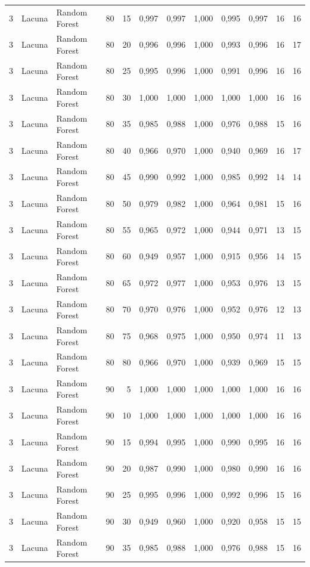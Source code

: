 \begin{longtable}{@{}rllrrrrrrrrr@{}}
3 & Lacuna & Random Forest & 80 & 15 & 0,997 & 0,997 & 1,000 & 0,995 & 0,997 & 16 & 16 \\
3 & Lacuna & Random Forest & 80 & 20 & 0,996 & 0,996 & 1,000 & 0,993 & 0,996 & 16 & 17 \\
3 & Lacuna & Random Forest & 80 & 25 & 0,995 & 0,996 & 1,000 & 0,991 & 0,996 & 16 & 16 \\
3 & Lacuna & Random Forest & 80 & 30 & 1,000 & 1,000 & 1,000 & 1,000 & 1,000 & 16 & 16 \\
3 & Lacuna & Random Forest & 80 & 35 & 0,985 & 0,988 & 1,000 & 0,976 & 0,988 & 15 & 16 \\
3 & Lacuna & Random Forest & 80 & 40 & 0,966 & 0,970 & 1,000 & 0,940 & 0,969 & 16 & 17 \\
3 & Lacuna & Random Forest & 80 & 45 & 0,990 & 0,992 & 1,000 & 0,985 & 0,992 & 14 & 14 \\
3 & Lacuna & Random Forest & 80 & 50 & 0,979 & 0,982 & 1,000 & 0,964 & 0,981 & 15 & 16 \\
3 & Lacuna & Random Forest & 80 & 55 & 0,965 & 0,972 & 1,000 & 0,944 & 0,971 & 13 & 15 \\
3 & Lacuna & Random Forest & 80 & 60 & 0,949 & 0,957 & 1,000 & 0,915 & 0,956 & 14 & 15 \\
3 & Lacuna & Random Forest & 80 & 65 & 0,972 & 0,977 & 1,000 & 0,953 & 0,976 & 13 & 15 \\
3 & Lacuna & Random Forest & 80 & 70 & 0,970 & 0,976 & 1,000 & 0,952 & 0,976 & 12 & 13 \\
3 & Lacuna & Random Forest & 80 & 75 & 0,968 & 0,975 & 1,000 & 0,950 & 0,974 & 11 & 13 \\
3 & Lacuna & Random Forest & 80 & 80 & 0,966 & 0,970 & 1,000 & 0,939 & 0,969 & 15 & 15 \\
3 & Lacuna & Random Forest & 90 & 5 & 1,000 & 1,000 & 1,000 & 1,000 & 1,000 & 16 & 16 \\
3 & Lacuna & Random Forest & 90 & 10 & 1,000 & 1,000 & 1,000 & 1,000 & 1,000 & 16 & 16 \\
3 & Lacuna & Random Forest & 90 & 15 & 0,994 & 0,995 & 1,000 & 0,990 & 0,995 & 16 & 16 \\
3 & Lacuna & Random Forest & 90 & 20 & 0,987 & 0,990 & 1,000 & 0,980 & 0,990 & 16 & 16 \\
3 & Lacuna & Random Forest & 90 & 25 & 0,995 & 0,996 & 1,000 & 0,992 & 0,996 & 15 & 16 \\
3 & Lacuna & Random Forest & 90 & 30 & 0,949 & 0,960 & 1,000 & 0,920 & 0,958 & 15 & 15 \\
3 & Lacuna & Random Forest & 90 & 35 & 0,985 & 0,988 & 1,000 & 0,976 & 0,988 & 15 & 16 \\

\end{longtable}
